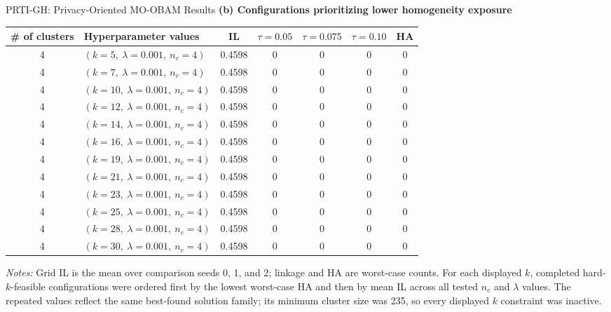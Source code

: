 \documentclass[9pt]{beamer}
\begin{document}
\begin{frame}[t]{PRTI-GH: Privacy-Oriented MO-OBAM Results}
    \scriptsize
    \centering
    \textbf{(b) Configurations prioritizing lower homogeneity exposure}

    \vspace{0.18cm}
    \renewcommand{\arraystretch}{1.18}
    \setlength{\tabcolsep}{3pt}

    \begin{tabular*}{\textwidth}{@{}@{\extracolsep{\fill}}clccccc@{}}
        \toprule
        \textbf{\# of clusters} & \textbf{Hyperparameter values} & \textbf{IL} &
        \textbf{$\tau=0.05$} & \textbf{$\tau=0.075$} &
        \textbf{$\tau=0.10$} & \textbf{HA} \\
        \midrule
        4 & $(k=5,\ \lambda=0.001,\ n_c=4)$  & 0.4598 & 0 & 0 & 0 & 0 \\
        4 & $(k=7,\ \lambda=0.001,\ n_c=4)$  & 0.4598 & 0 & 0 & 0 & 0 \\
        4 & $(k=10,\ \lambda=0.001,\ n_c=4)$ & 0.4598 & 0 & 0 & 0 & 0 \\
        4 & $(k=12,\ \lambda=0.001,\ n_c=4)$ & 0.4598 & 0 & 0 & 0 & 0 \\
        4 & $(k=14,\ \lambda=0.001,\ n_c=4)$ & 0.4598 & 0 & 0 & 0 & 0 \\
        4 & $(k=16,\ \lambda=0.001,\ n_c=4)$ & 0.4598 & 0 & 0 & 0 & 0 \\
        4 & $(k=19,\ \lambda=0.001,\ n_c=4)$ & 0.4598 & 0 & 0 & 0 & 0 \\
        4 & $(k=21,\ \lambda=0.001,\ n_c=4)$ & 0.4598 & 0 & 0 & 0 & 0 \\
        4 & $(k=23,\ \lambda=0.001,\ n_c=4)$ & 0.4598 & 0 & 0 & 0 & 0 \\
        4 & $(k=25,\ \lambda=0.001,\ n_c=4)$ & 0.4598 & 0 & 0 & 0 & 0 \\
        4 & $(k=28,\ \lambda=0.001,\ n_c=4)$ & 0.4598 & 0 & 0 & 0 & 0 \\
        4 & $(k=30,\ \lambda=0.001,\ n_c=4)$ & 0.4598 & 0 & 0 & 0 & 0 \\
        \bottomrule
    \end{tabular*}

    \vspace{0.22cm}
    \begin{minipage}{0.98\textwidth}
        \tiny
        \textit{Notes:} Grid IL is the mean over comparison seeds 0, 1, and
        2; linkage and HA are worst-case counts. For each displayed $k$,
        completed hard-$k$-feasible configurations were ordered first by the
        lowest worst-case HA and then by mean IL across all tested $n_c$ and
        $\lambda$ values. The repeated values reflect the same best-found
        solution family; its minimum cluster size was 235, so every displayed
        $k$ constraint was inactive.
    \end{minipage}
\end{frame}
\end{document}
